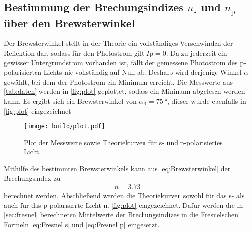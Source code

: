 \subsection{Bestimmung der Brechungsindizes $n_{\text{s}}$ und $n_{\text{p}}$ über den Brewsterwinkel}

Der Brewsterwinkel stellt in der Theorie ein vollständiges Verschwinden der Reflektion dar, sodass für den Photostrom
gilt $I{\text{p}}=0$.
Da zu jederzeit ein gewisser Untergrundstrom vorhanden ist, fällt der gemessene Photostrom des p-polarisierten Lichts nie
vollständig auf Null ab. Deshalb wird derjenige Winkel $\alpha$ gewählt, bei dem der Photostrom ein Minimum erreicht.
Die Messwerte aus \autoref{tab:daten} werden in \autoref{fig:plot} geplottet, sodass ein Minimum abgelesen werden kann.
Es ergibt sich ein Brewsterwinkel von $\alpha_{\text{B}}=\qty{75}{\degree}$, dieser wurde ebenfalls in \autoref{fig:plot} eingezeichnet.

\begin{figure}[H]
    \centering
    \texttt{[image: build/plot.pdf]}
    \caption{Plot der Messwerte sowie Theoriekurven für s- und p-polarisiertes Licht.}
    \label{fig:plot}
\end{figure}

Mithilfe des bestimmten Brewsterwinkels kann aus \eqref{eq:Brewsterwinkel} der Brechungsindex zu
\begin{gather*}
    n=\qty{3.73}{}
\end{gather*}
berechnet werden. Abschließend werden die Theoriekurven sowohl für das s- als auch für das p-polarisierte Licht
in \autoref{fig:plot} eingezeichnet. Dafür werden die in \autoref{sec:fresnel} berechneten Mittelwerte der Brechungsindizes
in die Fresnelschen Formeln \eqref{eq:Fresnel s} und \eqref{eq:Fresnel p} eingesetzt.